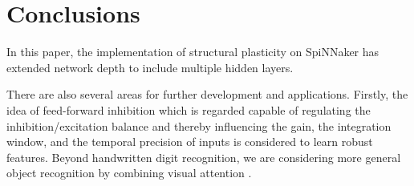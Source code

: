 \documentclass[letterpaper, 10 pt, conference]{ieeeconf}  %
\begin{document}
\section{Conclusions}\label{sec:conclusions}
In this paper, the implementation of structural plasticity on SpiNNaker has extended network depth to include multiple hidden layers.

There are also several areas for further development and applications.
Firstly, the idea of feed-forward inhibition which is regarded capable of regulating the inhibition/excitation balance and thereby influencing the gain, the integration window, and the temporal precision of inputs \cite{DSouza2016} is considered to learn robust features.
Beyond handwritten digit recognition, we are considering more general object recognition by combining visual attention \cite{Rea2013}.

%
%





\end{document}
